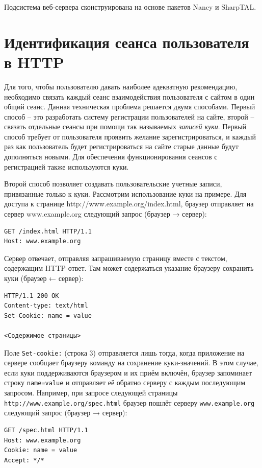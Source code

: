 \documentclass[a4paper,14pt,openany,final]{extreport} %
\begin{document}
Подсистема веб-сервера сконструирована на основе пакетов Nancy и SharpTAL. %

\section{Идентификация сеанса пользователя в HTTP}

Для того, чтобы пользователю давать наиболее адекватную рекомендацию, необходимо связать каждый сеанс взаимодействия пользователя с сайтом в один общий сеанс.  Данная техническая проблема решается двумя способами. Первый способ -- это разработать систему регистрации пользователей на сайте, второй -- связать отдельные сеансы при помощи так называемых \emph{записей куки}.  Первый способ требует от пользователя проявить желание зарегистрироваться, и каждый раз как пользователь будет регистрироваться на сайте старые данные будут дополняться новыми. Для обеспечения функционирования сеансов с регистрацией также используются куки.

Второй способ позволяет создавать пользовательские учетные записи, привязанные только к куки. Рассмотрим использование куки на примере.  Для доступа к странице http://www.example.org/index.html, браузер отправляет на сервер www.example.org следующий запрос (браузер → сервер):
\begin{verbatim}
GET /index.html HTTP/1.1
Host: www.example.org
\end{verbatim}
Сервер отвечает, отправляя запрашиваемую страницу вместе с текстом, содержащим HTTP-ответ. Там может содержаться указание браузеру сохранить куки (браузер ← сервер):
\begin{verbatim}
HTTP/1.1 200 OK
Content-type: text/html
Set-Cookie: name = value

<Содержимое страницы>
\end{verbatim}

Поле \verb|Set-cookie:| (строка 3) отправляется лишь тогда, когда приложение на сервере сообщает браузеру команду на сохранение куки-значений. В этом случае, если куки поддерживаются браузером и их приём включён, браузер запоминает строку \verb|name=value| и отправляет её обратно серверу с каждым последующим запросом. Например, при запросе следующей страницы \verb|http://www.example.org/spec.html| браузер пошлёт серверу \verb|www.example.org| следующий запрос (браузер → сервер):
\begin{verbatim}
GET /spec.html HTTP/1.1
Host: www.example.org
Cookie: name = value
Accept: */*
\end{verbatim}
\end{document}
